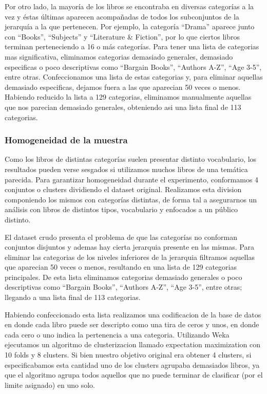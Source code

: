 \documentclass[12pt,journal,compsoc]{IEEEtran}
\begin{document}
Por otro lado, la mayoría de los libros se encontraba en diversas categorías a la vez y éstas últimas aparecen acompañadas de todos los subconjuntos de la jerarquía a la que pertenecen. Por ejemplo, la categoría ``Drama'' aparece junto con ``Books'', ``Subjects'' y ``Literature \& Fiction'', por lo que ciertos libros terminan perteneciendo a 16 o más categorías. Para tener una lista de categorias mas significativa, eliminamos categorias demasiado generales, demasiado especificas o poco descriptivas como ``Bargain Books'', ``Authors A-Z'', ``Age 3-5'', entre otras. Confeccionamos una lista de estas categorias y, para eliminar aquellas demasiado especificas, dejamos fuera a las que aparecian 50 veces o menos. Habiendo reducido la lista a 129 categorias, eliminamos manualmente aquellas que nos parecian demasiado generales, obteniendo asi una lista final de 113 categorias.

\subsubsection{Homogeneidad de la muestra}

Como los libros de distintas categorías suelen presentar distinto vocabulario, los resultados pueden verse sesgados si utilizamos muchos libros de una temática parecida. Para garantizar homogeneidad durante el experimento, conformamos 4 conjuntos o clusters dividiendo el dataset original. Realizamos esta division componiendo los mismos con categorías distintas, de forma tal a asegurarnos un análisis con libros de distintos tipos, vocabulario y enfocados a un público distinto. 

El dataset crudo presenta el problema de que las categorías no conforman conjuntos disjuntos y ademas hay cierta jerarquia presente en las mismas. Para eliminar las categorias de los niveles inferiores de la jerarquia filtramos aquellas que aparecian 50 veces o menos, resultando en una lista de 129 categorias principales. De esta lista eliminamos categorias demasiado generales o poco descriptivas como ``Bargain Books'', ``Authors A-Z'', ``Age 3-5'', entre otras; llegando a una lista final de 113 categorias.

Habiendo confeccionado esta lista realizamos una codificacion de la base de datos en donde cada libro puede ser descripto como una tira de ceros y unos, en donde cada cero o uno indica la pertenencia a una categoria. Utilizando Weka ejecutamos un algoritmo de clusterizacion llamado expectation maximization con 10 folds y 8 clusters. Si bien nuestro objetivo original era obtener 4 clusters, si especificabamos esta cantidad uno de los clusters agrupaba demasiados libros, ya que el algoritmo agrupa todos aquellos que no puede terminar de clasificar (por el limite asignado) en uno solo.
\end{document}
